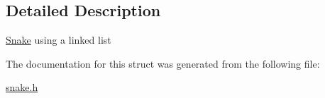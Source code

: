 \subsection{Detailed Description}
\hyperlink{structSnake}{Snake} using a linked list 

The documentation for this struct was generated from the following file\+:\begin{DoxyCompactItemize}
\item 
\hyperlink{snake_8h}{snake.\+h}\end{DoxyCompactItemize}
